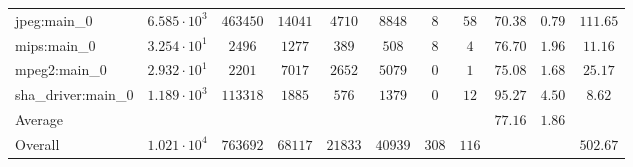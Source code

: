 \begin{tabular}{|l|c|c|c|c|c|c|c|c|c|c|}
jpeg:main\_0            & $ 6.585 \cdot 10^{3} $ & $ 463450 $ & $ 14041 $ & $ 4710  $ & $ 8848  $ & $ 8   $ & $ 58  $ & $ 70.38       $ & $ 0.79    $ & $ 111.65  $ \\
mips:main\_0            & $ 3.254 \cdot 10^{1} $ & $ 2496   $ & $ 1277  $ & $ 389   $ & $ 508   $ & $ 8   $ & $ 4   $ & $ 76.70       $ & $ 1.96    $ & $ 11.16   $ \\
mpeg2:main\_0           & $ 2.932 \cdot 10^{1} $ & $ 2201   $ & $ 7017  $ & $ 2652  $ & $ 5079  $ & $ 0   $ & $ 1   $ & $ 75.08       $ & $ 1.68    $ & $ 25.17   $ \\
sha\_driver:main\_0     & $ 1.189 \cdot 10^{3} $ & $ 113318 $ & $ 1885  $ & $ 576   $ & $ 1379  $ & $ 0   $ & $ 12  $ & $ 95.27       $ & $ 4.50    $ & $ 8.62    $ \\
\hline
Average                 & $                    $ & $        $ & $       $ & $       $ & $       $ & $     $ & $     $ & $ 77.16       $ & $ 1.86    $ & $         $ \\
\hline
Overall                 & $ 1.021 \cdot 10^{4} $ & $ 763692 $ & $ 68117 $ & $ 21833 $ & $ 40939 $ & $ 308 $ & $ 116 $ & $             $ & $         $ & $ 502.67  $ \\
\hline
\end{tabular}
